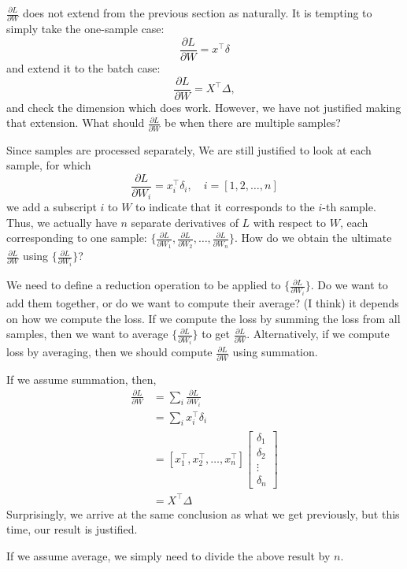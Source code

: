 \documentclass{article}
\begin{document}
$\frac{\partial L}{\partial W}$ does not extend from the previous section as naturally. It is tempting to simply take the one-sample case:
\begin{equation}
    \frac{\partial L}{\partial W} = x^\top\delta
\end{equation}
and extend it to the batch case:
\begin{equation}
    \frac{\partial L}{\partial W} = X^\top\Delta,
\end{equation}
and check the dimension which does work. However, we have not justified making that extension. What should $\frac{\partial L}{\partial W}$ be when there are multiple samples? 

Since samples are processed separately, We are still justified to look at each sample, for which 
\begin{equation}
    \frac{\partial L}{\partial W_i} = x_i^\top\delta_i, \quad i = [1, 2, \dots, n]
\end{equation}
we add a subscript $i$ to $W$ to indicate that it corresponds to the $i$-th sample. Thus, we actually have $n$ separate derivatives of $L$ with respect to $W$, each corresponding to one sample: $\{\frac{\partial L}{\partial W_1}, \frac{\partial L}{\partial W_2}, \dots, \frac{\partial L}{\partial W_n}\}$. How do we obtain the ultimate $\frac{\partial L}{\partial W}$ using $\{\frac{\partial L}{\partial W_i}\}$? 

We need to define a reduction operation to be applied to $\{\frac{\partial L}{\partial W_i}\}$. Do we want to add them together, or do we want to compute their average? (I think) it depends on how we compute the loss. If we compute the loss by summing the loss from all samples, then we want to average $\{\frac{\partial L}{\partial W_i}\}$ to get $\frac{\partial L}{\partial W}$. Alternatively, if we compute loss by averaging, then we should compute $\frac{\partial L}{\partial W}$ using summation. 

If we assume summation, then, 
\begin{align}
    \frac{\partial L}{\partial W} &= \sum_i \frac{\partial L}{\partial W_i} \\
    &= \sum_i x_i^\top\delta_i \\
    &= [x_1^\top, x_2^\top, \dots, x_n^\top]
       \begin{bmatrix}
       \delta_1 \\
       \delta_2 \\
       \vdots \\
       \delta_n
       \end{bmatrix} \\
    &= X^\top\Delta
\end{align}
Surprisingly, we arrive at the same conclusion as what we get previously, but this time, our result is justified. 

If we assume average, we simply need to divide the above result by $n$. 
\end{document}
